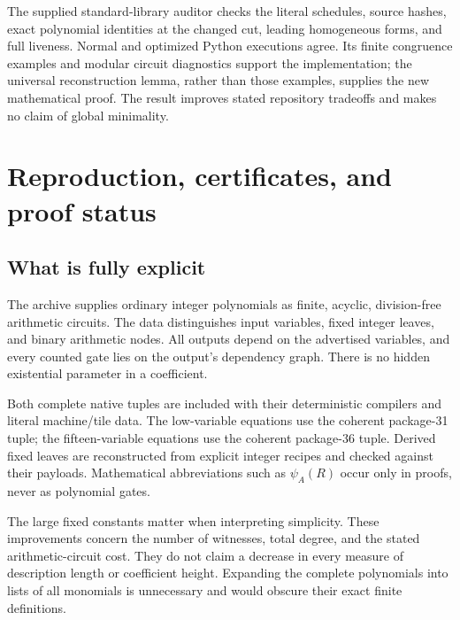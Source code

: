 \documentclass[11pt,letterpaper]{article}
\theoremstyle{remark}\newtheorem{remark}[theorem]{Remark}
\begin{document}
The supplied standard-library auditor checks the literal schedules, source
hashes, exact polynomial identities at the changed cut, leading homogeneous
forms, and full liveness.  Normal and optimized Python executions agree.
Its finite congruence examples and modular circuit diagnostics support the
implementation; the universal reconstruction lemma, rather than those
examples, supplies the new mathematical proof.  The result improves stated
repository tradeoffs and makes no claim of global minimality.


\section{Reproduction, certificates, and proof status}\label{sec:audit}
\subsection{What is fully explicit}
The archive supplies ordinary integer polynomials as finite, acyclic,
division-free arithmetic circuits. The data distinguishes input variables,
fixed integer leaves, and binary arithmetic nodes. All outputs depend on
the advertised variables, and every counted gate lies on the output's
dependency graph. There is no hidden existential parameter in a coefficient.

Both complete native tuples are included with their deterministic compilers
and literal machine/tile data. The low-variable equations use the coherent
package-31 tuple; the fifteen-variable equations use the coherent
package-36 tuple. Derived fixed leaves are reconstructed from explicit
integer recipes and checked against their payloads. Mathematical abbreviations
such as $\psi_A(R)$ occur only in proofs, never as polynomial gates.

The large fixed constants matter when interpreting simplicity.
These improvements concern the number of witnesses, total degree, and
the stated arithmetic-circuit cost. They do not claim a decrease in every
measure of description length or coefficient height. Expanding the complete
polynomials into lists of all monomials is unnecessary and would obscure
their exact finite definitions.
\end{document}
